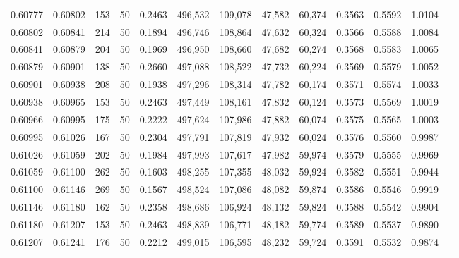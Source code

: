 \begin{tabular}{rrrrrrrrrrrrr}
0.60777 & 0.60802 &   153 &  50 &                                     0.2463 & 496,532 & 109,078 &  47,582 &  60,374 & 0.3563 & 0.5592 & 1.0104 \\
0.60802 & 0.60841 &   214 &  50 &                                     0.1894 & 496,746 & 108,864 &  47,632 &  60,324 & 0.3566 & 0.5588 & 1.0084 \\
0.60841 & 0.60879 &   204 &  50 &                                     0.1969 & 496,950 & 108,660 &  47,682 &  60,274 & 0.3568 & 0.5583 & 1.0065 \\
0.60879 & 0.60901 &   138 &  50 &                                     0.2660 & 497,088 & 108,522 &  47,732 &  60,224 & 0.3569 & 0.5579 & 1.0052 \\
0.60901 & 0.60938 &   208 &  50 &                                     0.1938 & 497,296 & 108,314 &  47,782 &  60,174 & 0.3571 & 0.5574 & 1.0033 \\
0.60938 & 0.60965 &   153 &  50 &                                     0.2463 & 497,449 & 108,161 &  47,832 &  60,124 & 0.3573 & 0.5569 & 1.0019 \\
0.60966 & 0.60995 &   175 &  50 &                                     0.2222 & 497,624 & 107,986 &  47,882 &  60,074 & 0.3575 & 0.5565 & 1.0003 \\
0.60995 & 0.61026 &   167 &  50 &                                     0.2304 & 497,791 & 107,819 &  47,932 &  60,024 & 0.3576 & 0.5560 & 0.9987 \\
0.61026 & 0.61059 &   202 &  50 &                                     0.1984 & 497,993 & 107,617 &  47,982 &  59,974 & 0.3579 & 0.5555 & 0.9969 \\
0.61059 & 0.61100 &   262 &  50 &                                     0.1603 & 498,255 & 107,355 &  48,032 &  59,924 & 0.3582 & 0.5551 & 0.9944 \\
0.61100 & 0.61146 &   269 &  50 &                                     0.1567 & 498,524 & 107,086 &  48,082 &  59,874 & 0.3586 & 0.5546 & 0.9919 \\
0.61146 & 0.61180 &   162 &  50 &                                     0.2358 & 498,686 & 106,924 &  48,132 &  59,824 & 0.3588 & 0.5542 & 0.9904 \\
0.61180 & 0.61207 &   153 &  50 &                                     0.2463 & 498,839 & 106,771 &  48,182 &  59,774 & 0.3589 & 0.5537 & 0.9890 \\
0.61207 & 0.61241 &   176 &  50 &                                     0.2212 & 499,015 & 106,595 &  48,232 &  59,724 & 0.3591 & 0.5532 & 0.9874 \\

\end{tabular}
